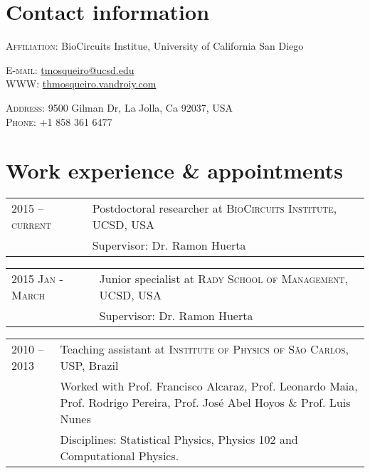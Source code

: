 \documentclass[letter,10pt]{article} %
\begin{document}
\par{\bigskip\par}
\par{\bigskip\par}

\section{Contact information}

\textsc{Affiliation:} BioCircuits Institue, University of California San Diego

\begin{minipage}{0.4\textwidth}
  \textsc{E-mail:} \href{mailto:tmosqueiro@ucsd.edu}{tmosqueiro@ucsd.edu} \\
  \textsc{WWW:} \href{http://thmosqueiro.vandroiy.com}{thmosqueiro.vandroiy.com}
\end{minipage}
\begin{minipage}{0.5\textwidth}
  \textsc{Address:} 9500 Gilman Dr, La Jolla, Ca 92037, USA \\
  \textsc{Phone:} +1 858 361 6477
\end{minipage}



\section{Work experience \& appointments}

\begin{tabular}{p{2.8cm}|p{11cm}}
  \textsc{2015 -- current} & Postdoctoral researcher at \textsc{BioCircuits Institute}, UCSD, USA \emph{}\\
  & \footnotesize{Supervisor: Dr. Ramon Huerta}
\end{tabular}

\begin{tabular}{p{2.8cm}|p{11cm}}
  \textsc{2015 Jan - March} & Junior specialist at \textsc{Rady School of Management}, UCSD, USA \emph{}\\
  & \footnotesize{Supervisor: Dr. Ramon Huerta}
\end{tabular}

\begin{tabular}{p{2.8cm}|p{11cm}}
  \textsc{2010 -- 2013} & Teaching assistant at \textsc{Institute of Physics of S\~ao Carlos}, USP, Brazil\\
  & \footnotesize{Worked with Prof. Francisco Alcaraz, Prof. Leonardo Maia, Prof. Rodrigo Pereira, Prof. Jos\'e Abel Hoyos \& Prof. Luis Nunes}\\
  & \footnotesize{Disciplines: Statistical Physics, Physics 102 and Computational Physics.}
\end{tabular}
\end{document}
